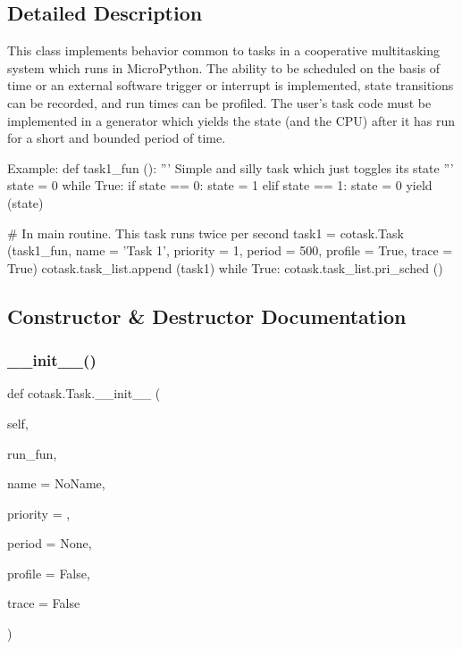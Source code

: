 \subsection{Detailed Description}
\begin{DoxyVerb}This class implements behavior common to tasks in a cooperative 
multitasking system which runs in MicroPython. The ability to be scheduled
on the basis of time or an external software trigger or interrupt is 
implemented, state transitions can be recorded, and run times can be
profiled. The user's task code must be implemented in a generator which
yields the state (and the CPU) after it has run for a short and bounded 
period of time. 

Example:
\code
def task1_fun ():
    ''' Simple and silly task which just toggles its state '''
    state = 0
    while True:
        if state == 0:
            state = 1
        elif state == 1:
            state = 0
        yield (state)

# In main routine. This task runs twice per second
task1 = cotask.Task (task1_fun, name = 'Task 1', priority = 1, 
                     period = 500, profile = True, trace = True)
cotask.task_list.append (task1)
while True: 
    cotask.task_list.pri_sched ()
\endcode \end{DoxyVerb}
 

\subsection{Constructor \& Destructor Documentation}
\mbox{\label{classcotask_1_1_task_a20a30d252e750706e77553a6244ae457}} 
\subsubsection{\texorpdfstring{\_\_init\_\_()}{\_\_init\_\_()}}
{\footnotesize\ttfamily def cotask.\+Task.\+\_\+\+\_\+init\+\_\+\+\_\+ (\begin{DoxyParamCaption}\item[{}]{self,  }\item[{}]{run\+\_\+fun,  }\item[{}]{name = {\ttfamily \textquotesingle{}NoName\textquotesingle{}},  }\item[{}]{priority = {},  }\item[{}]{period = {\ttfamily None},  }\item[{}]{profile = {\ttfamily False},  }\item[{}]{trace = {\ttfamily False} }\end{DoxyParamCaption})}

